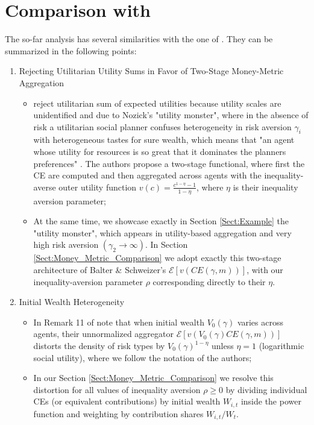 \documentclass[11pt,a4paper]{article}
\theoremstyle{definition}
\theoremstyle{plain}
\theoremstyle{remark}
\newcommand{\1}{\mathbf{1}}
\begin{document}
\section{Comparison with \citet{BalterSchweizer2024}}
The so-far analysis has several similarities with the one of \citet{BalterSchweizer2024}. They can be summarized in the following points:
\begin{enumerate}
    \item Rejecting Utilitarian Utility Sums in Favor of Two-Stage Money-Metric Aggregation
    \begin{itemize}
        \item \citet{BalterSchweizer2024} reject \citet{Harsanyi1955} utilitarian sum of expected utilities because utility scales are unidentified and due to Nozick's "utility monster", where in the absence of risk a utilitarian social planner confuses heterogeneity in risk aversion $\gamma_i$ with heterogeneous tastes for sure wealth, which means that "an agent whose utility for resources is so great that it dominates the planners preferences" \citep{BalterSchweizer2024}. The authors propose a two-stage functional, where first the CE are computed and then aggregated across agents with the inequality-averse outer utility function $v(c) = \frac{c^{1-\eta}-1}{1-\eta}$, where $\eta$ is their inequality aversion parameter;
        \item At the same time, we showcase exactly in Section \ref{Sect:Example} the "utility monster", which appears in utility-based aggregation and very high risk aversion $(\gamma_2 \to \infty)$. In Section \ref{Sect:Money_Metric_Comparison} we adopt exactly this two-stage architecture of Balter \& Schweizer's $\mathcal{E}[v(CE(\gamma, m))]$, with our inequality-aversion parameter $\rho$ corresponding directly to their $\eta$.
    \end{itemize}
    \item Initial Wealth Heterogeneity
    \begin{itemize}
        \item In Remark 11 of \citet{BalterSchweizer2024} note that when initial wealth $V_0(\gamma)$ varies across agents, their unnormalized aggregator $\mathcal{E}[v(V_0(\gamma) CE(\gamma, m))]$ distorts the density of risk types by $V_0(\gamma)^{1-\eta}$ unless $\eta = 1$ (logarithmic social utility), where we follow the notation of the authors;
        \item In our Section \ref{Sect:Money_Metric_Comparison} we resolve this distortion for all values of inequality aversion $\rho \geq 0$ by dividing individual CEs (or equivalent contributions) by initial wealth $W_{i,t}$ inside the power function and weighting by contribution shares $W_{i,t}/W_t$.

\end{itemize}
\end{enumerate}
\end{document}
